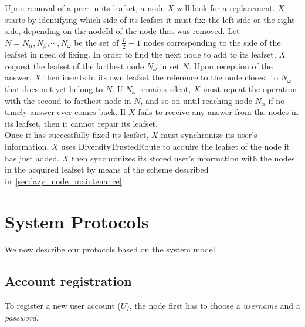 Upon removal of a peer in its leafset, a node $X$ will look for a replacement.
$X$ starts by identifying which side of its leafset it must fix: the left side
or the right side, depending on the nodeId of the node that was removed. Let $N
= {N_{\alpha}, N_{\beta}, \cdots, N_{\omega}}$ be the set of $\frac{L}{2} - 1$
nodes corresponding to the side of the leafset in need of fixing. In order to
find the next node to add to its leafset, $X$ request the leafset of the
farthest node $N_{\omega}$ in set $N$. Upon reception of the answer, $X$ then
inserts in its own leafset the reference to the node closest to $N_{\omega}$
that does not yet belong to $N$. If $N_{\omega}$ remains silent, $X$ must
repeat the operation with the second to farthest node in $N$, and so on until
reaching node $N_{\alpha}$ if no timely answer ever comes back. If $X$ fails to
receive any answer from the nodes in its leafset, then it cannot repair its
leafset.\\

Once it has successfully fixed its leafset, $X$ must synchronize its user's
information. $X$
uses DiversityTrustedRoute to acquire the leafset of the node it has just
added. $X$ then synchronizes its stored user's information with the nodes in
the acquired leafset by means of the scheme described in~\ref{sec:lazy_node_maintenance}.


\section{System Protocols}
We now describe our protocols based on the system model. 

\subsection{Account registration}

To register a new user account ($U$), the node first
has to choose a \textit{username} and a \textit{password}.
% 
% 


